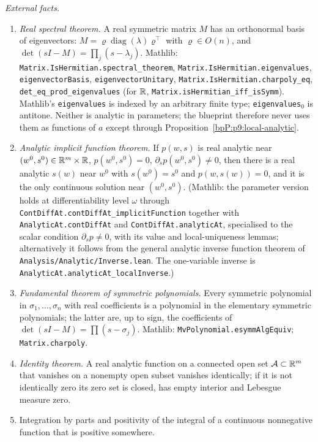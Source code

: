 \emph{External facts.}
\begin{enumerate}[label=(E\arabic*),ref=(E\arabic*)]
\item\label{bpP:p9:e-spec} \emph{Real spectral theorem.} A real symmetric matrix $M$ has an orthonormal basis of eigenvectors: $M=\varrho\operatorname{diag}(\lambda)\varrho^\top$ with $\varrho\in O(n)$, and $\det(sI-M)=\prod_j(s-\lambda_j)$. Mathlib: \texttt{Matrix.IsHermitian.spectral\_theorem}, \texttt{Matrix.IsHermitian.eigenvalues}, \texttt{eigenvectorBasis}, \texttt{eigenvectorUnitary}, \texttt{Matrix.IsHermitian.charpoly\_eq}, \texttt{det\_eq\_prod\_eigenvalues} (for $\mathbb{R}$, \texttt{Matrix.isHermitian\_iff\_isSymm}). Mathlib's \texttt{eigenvalues} is indexed by an arbitrary finite type; \texttt{eigenvalues$_0$} is antitone. Neither is analytic in parameters; the blueprint therefore never uses them as functions of $a$ except through Proposition~\ref{bpP:p9:local-analytic}.
\item\label{bpP:p9:e-ift} \emph{Analytic implicit function theorem.} If $p(w,s)$ is real analytic near $(w^0,s^0)\in\mathbb{R}^m\times\mathbb{R}$, $p(w^0,s^0)=0$, $\partial_sp(w^0,s^0)\ne0$, then there is a real analytic $s(w)$ near $w^0$ with $s(w^0)=s^0$ and $p(w,s(w))=0$, and it is the only continuous solution near $(w^0,s^0)$. (Mathlib: the parameter version holds at differentiability level $\omega$ through \texttt{ContDiffAt.contDiffAt\_implicitFunction} together with \texttt{AnalyticAt.contDiffAt} and \texttt{ContDiffAt.analyticAt}, specialised to the scalar condition $\partial_sp\ne0$, with its value and local-uniqueness lemmas; alternatively it follows from the general analytic inverse function theorem of \texttt{Analysis/Analytic/Inverse.lean}. The one-variable inverse is \texttt{AnalyticAt.analyticAt\_localInverse}.)
\item\label{bpP:p9:e-fts} \emph{Fundamental theorem of symmetric polynomials.} Every symmetric polynomial in $\sigma_1,\dots,\sigma_n$ with real coefficients is a polynomial in the elementary symmetric polynomials; the latter are, up to sign, the coefficients of $\det(sI-M)=\prod(s-\sigma_j)$. Mathlib: \texttt{MvPolynomial.esymmAlgEquiv}; \texttt{Matrix.charpoly}.
\item\label{bpP:p9:e-id} \emph{Identity theorem.} A real analytic function on a connected open set $\mathcal A\subset\mathbb{R}^m$ that vanishes on a nonempty open subset vanishes identically; if it is not identically zero its zero set is closed, has empty interior and Lebesgue measure zero.
\item\label{bpP:p9:e-ibp} Integration by parts and positivity of the integral of a continuous nonnegative function that is positive somewhere.
\end{enumerate}

